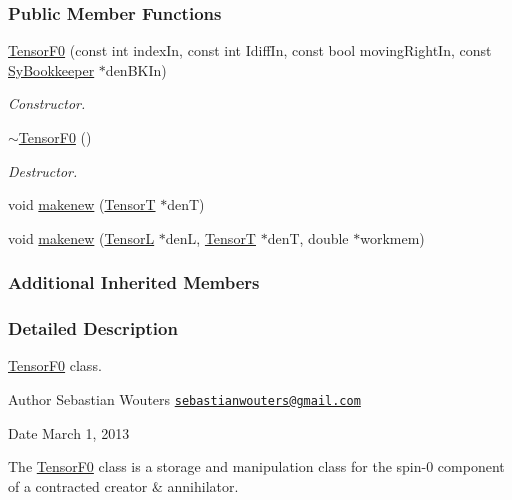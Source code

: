 \subsubsection*{Public Member Functions}
\begin{DoxyCompactItemize}
\item 
\hyperlink{classCheMPS2_1_1TensorF0_a12eee07bfc3fc0166a59e362155b95cc}{Tensor\-F0} (const int index\-In, const int Idiff\-In, const bool moving\-Right\-In, const \hyperlink{classCheMPS2_1_1SyBookkeeper}{Sy\-Bookkeeper} $\ast$den\-B\-K\-In)
\begin{DoxyCompactList}\small\item\em Constructor. \end{DoxyCompactList}\item 
\hypertarget{classCheMPS2_1_1TensorF0_a316a5ffaf0bae0259d2744cc7c0f62f0}{\hyperlink{classCheMPS2_1_1TensorF0_a316a5ffaf0bae0259d2744cc7c0f62f0}{$\sim$\-Tensor\-F0} ()}\label{classCheMPS2_1_1TensorF0_a316a5ffaf0bae0259d2744cc7c0f62f0}

\begin{DoxyCompactList}\small\item\em Destructor. \end{DoxyCompactList}\item 
void \hyperlink{classCheMPS2_1_1TensorF0_acc2300553af349f29b630950f33e3bec}{makenew} (\hyperlink{classCheMPS2_1_1TensorT}{Tensor\-T} $\ast$den\-T)
\item 
void \hyperlink{classCheMPS2_1_1TensorF0_a5a5bbdc1da1934e6ce77849f54c79c7e}{makenew} (\hyperlink{classCheMPS2_1_1TensorL}{Tensor\-L} $\ast$den\-L, \hyperlink{classCheMPS2_1_1TensorT}{Tensor\-T} $\ast$den\-T, double $\ast$workmem)
\end{DoxyCompactItemize}
\subsubsection*{Additional Inherited Members}


\subsubsection{Detailed Description}
\hyperlink{classCheMPS2_1_1TensorF0}{Tensor\-F0} class. \begin{DoxyAuthor}{Author}
Sebastian Wouters \href{mailto:sebastianwouters@gmail.com}{\tt sebastianwouters@gmail.\-com} 
\end{DoxyAuthor}
\begin{DoxyDate}{Date}
March 1, 2013
\end{DoxyDate}
The \hyperlink{classCheMPS2_1_1TensorF0}{Tensor\-F0} class is a storage and manipulation class for the spin-\/0 component of a contracted creator \& annihilator. 

